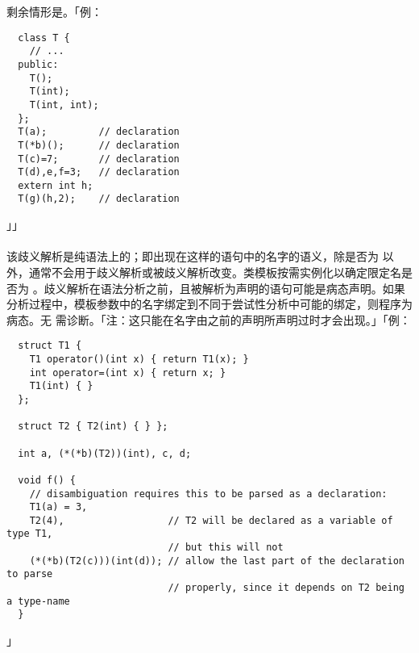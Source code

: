 剩余情形是。「例：
\begin{lstlisting}
  class T {
    // ...
  public:
    T();
    T(int);
    T(int, int);
  };
  T(a);         // declaration
  T(*b)();      // declaration
  T(c)=7;       // declaration
  T(d),e,f=3;   // declaration
  extern int h;
  T(g)(h,2);    // declaration
\end{lstlisting}」」

\paragraph{}
该歧义解析是纯语法上的；即出现在这样的语句中的名字的语义，除是否为
以外，通常不会用于歧义解析或被歧义解析改变。类模板按需实例化以确定限定名是否为
。歧义解析在语法分析之前，且被解析为声明的语句可能是病态声明。如果
分析过程中，模板参数中的名字绑定到不同于尝试性分析中可能的绑定，则程序为病态。无
需诊断。「注：这只能在名字由之前的声明所声明过时才会出现。」「例：
\begin{lstlisting}
  struct T1 {
    T1 operator()(int x) { return T1(x); }
    int operator=(int x) { return x; }
    T1(int) { }
  };

  struct T2 { T2(int) { } };

  int a, (*(*b)(T2))(int), c, d;

  void f() {
    // disambiguation requires this to be parsed as a declaration:
    T1(a) = 3,
    T2(4),                  // T2 will be declared as a variable of type T1,
                            // but this will not
    (*(*b)(T2(c)))(int(d)); // allow the last part of the declaration to parse
                            // properly, since it depends on T2 being a type-name
  }
\end{lstlisting}」

